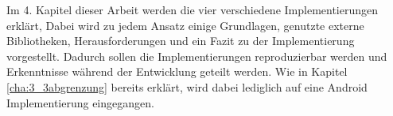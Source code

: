 Im 4. Kapitel dieser Arbeit werden die vier verschiedene Implementierungen erklärt, Dabei wird zu jedem Ansatz einige Grundlagen, genutzte externe Bibliotheken, Herausforderungen und ein Fazit zu der Implementierung vorgestellt. Dadurch sollen die Implementierungen reproduzierbar werden und Erkenntnisse während der Entwicklung geteilt werden. Wie in Kapitel \ref{cha:3_3abgrenzung} bereits erklärt, wird dabei lediglich auf eine Android Implementierung eingegangen. 







